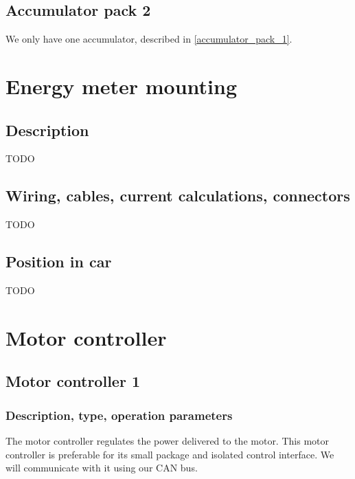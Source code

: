 \documentclass{article}
\begin{document}
\subsection{Accumulator pack 2}\label{accumulator_pack_2}
We only have one accumulator, described in \ref{accumulator_pack_1}.

\section{Energy meter mounting} \label{energy_meter_mounting}
\subsection{Description}
TODO

\subsection{Wiring, cables, current calculations, connectors}
TODO

\subsection{Position in car}
TODO


\section{Motor controller}\label{motor_controller}
\subsection{Motor controller 1}\label{motor_controller_1}
\subsubsection{Description, type, operation parameters}

The motor controller regulates the power delivered to the motor. This motor controller is preferable for its small package and isolated control interface. We will communicate with it using our CAN bus. 
\end{document}
